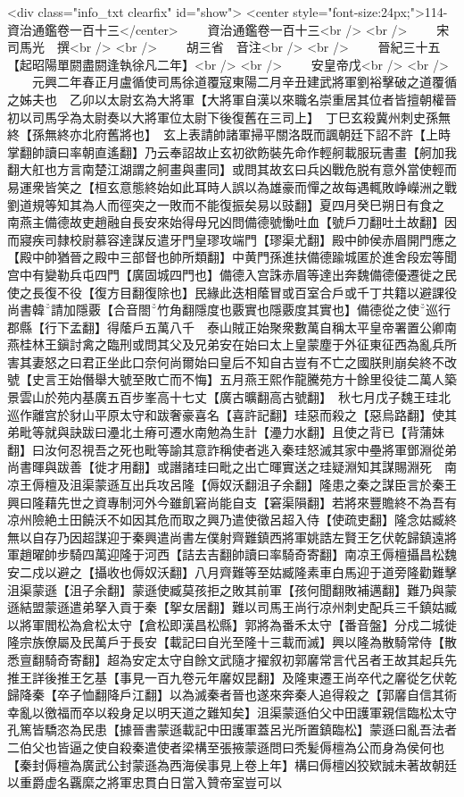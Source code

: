 <div class="info_txt clearfix" id="show">
<center style="font-size:24px;">114-資治通鑑卷一百十三</center>
  　　資治通鑑卷一百十三<br />
<br />
　　宋　司馬光　撰<br />
<br />
　　胡三省　音注<br />
<br />
　　晉紀三十五【起昭陽單閼盡閼逢執徐凡二年】<br />
<br />
　　安皇帝戊<br />
<br />
　　元興二年春正月盧循使司馬徐道覆寇東陽二月辛丑建武將軍劉裕擊破之道覆循之姊夫也　乙卯以太尉玄為大將軍【大將軍自漢以來職名崇重居其位者皆擅朝權晉初以司馬孚為太尉奏以大將軍位太尉下後復舊在三司上】　丁巳玄殺冀州刺史孫無終【孫無終亦北府舊將也】　玄上表請帥諸軍掃平關洛既而諷朝廷下詔不許【上時掌翻帥讀曰率朝直遙翻】乃云奉詔故止玄初欲飭裝先命作輕舸載服玩書畫【舸加我翻大舡也方言南楚江湖謂之舸畫與畫同】或問其故玄曰兵凶戰危脱有意外當使輕而易運衆皆笑之【桓玄意態終始如此耳時人誤以為雄豪而憚之故每遇輒敗峥嶸洲之戰劉道規等知其為人而徑突之一敗而不能復振矣易以豉翻】夏四月癸巳朔日有食之　南燕主備德故吏趙融自長安來始得母兄凶問備德號慟吐血【號戶刀翻吐土故翻】因而寢疾司隸校尉慕容達謀反遣牙門皇璆攻端門【璆渠尤翻】殿中帥侯赤眉開門應之【殿中帥猶晉之殿中三部督也帥所類翻】中黄門孫進扶備德踰城匿於進舍段宏等聞宫中有變勒兵屯四門【廣固城四門也】備德入宫誅赤眉等達出奔魏備德優遷徙之民使之長復不役【復方目翻復除也】民緣此迭相䕃冒或百室合戶或千丁共籍以避課役尚書韓請加隱覈【合音閤竹角翻隱度也覈實也隱覈度其實也】備德從之使巡行郡縣【行下孟翻】得䕃戶五萬八千　泰山賊正始聚衆數萬自稱太平皇帝署置公卿南燕桂林王鎭討禽之臨刑或問其父及兄弟安在始曰太上皇蒙塵于外征東征西為亂兵所害其妻怒之曰君正坐此口奈何尚爾始曰皇后不知自古豈有不亡之國朕則崩矣終不改號【史言王始僭舉大號至敗亡而不悔】五月燕王熙作龍騰苑方十餘里役徒二萬人築景雲山於苑内基廣五百步峯高十七丈【廣古曠翻高古號翻】　秋七月戊子魏王珪北巡作離宫於豺山平原太守和跋奢豪喜名【喜許記翻】珪惡而殺之【惡烏路翻】使其弟毗等就與訣跋曰灅北土瘠可遷水南勉為生計【灅力水翻】且使之背已【背蒲妹翻】曰汝何忍視吾之死也毗等諭其意詐稱使者逃入秦珪怒滅其家中壘將軍鄧淵從弟尚書暉與跋善【徙才用翻】或譖諸珪曰毗之出亡暉實送之珪疑淵知其謀賜淵死　南凉王傉檀及沮渠蒙遜互出兵攻呂隆【傉奴沃翻沮子余翻】隆患之秦之謀臣言於秦王興曰隆藉先世之資專制河外今雖飢窘尚能自支【窘渠隕翻】若將來豐贍終不為吾有凉州險絶土田饒沃不如因其危而取之興乃遣使徵呂超入侍【使疏吏翻】隆念姑臧終無以自存乃因超謀迎于秦興遣尚書左僕射齊難鎮西將軍姚誥左賢王乞伏乾歸鎮遠將軍趙曜帥步騎四萬迎隆于河西【詰去吉翻帥讀曰率騎奇寄翻】南凉王傉檀攝昌松魏安二戍以避之【攝收也傉奴沃翻】八月齊難等至姑臧隆素車白馬迎于道旁隆勸難擊沮渠蒙遜【沮子余翻】蒙遜使臧莫孩拒之敗其前軍【孩何聞翻敗補邁翻】難乃與蒙遜結盟蒙遜遣弟拏入貢于秦【挐女居翻】難以司馬王尚行凉州刺史配兵三千鎮姑臧以將軍閻松為倉松太守【倉松即漢昌松縣】郭將為番禾太守【番音盤】分戍二城徙隆宗族僚屬及民萬戶于長安【載記曰自光至隆十三載而滅】興以隆為散騎常侍【散悉亶翻騎奇寄翻】超為安定太守自餘文武隨才擢叙初郭黁常言代呂者王故其起兵先推王詳後推王乞基【事見一百九卷元年黁奴昆翻】及隆東遷王尚卒代之黁從乞伏乾歸降秦【卒子恤翻降戶江翻】以為滅秦者晉也遂來奔秦人追得殺之【郭黁自信其術幸亂以徼福而卒以殺身足以明天道之難知矣】沮渠蒙遜伯父中田護軍親信臨松太守孔篤皆驕恣為民患【據晉書蒙遜載記中田護軍蓋呂光所置鎮臨松】蒙遜曰亂吾法者二伯父也皆逼之使自殺秦遣使者梁構至張掖蒙遜問曰秃髪傉檀為公而身為侯何也【秦封傉檀為廣武公封蒙遜為西海侯事見上卷上年】構曰傉檀凶狡欵誠未著故朝廷以重爵虚名覊縻之將軍忠貫白日當入贊帝室豈可以